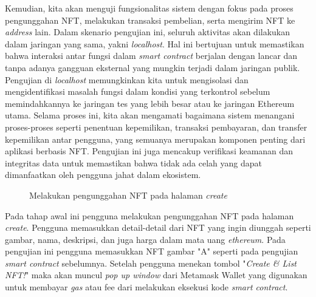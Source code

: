     Kemudian, kita akan menguji fungsionalitas sistem dengan fokus pada proses pengunggahan NFT, melakukan transaksi pembelian, serta mengirim NFT ke \emph{address} lain. Dalam skenario pengujian ini, seluruh aktivitas akan dilakukan dalam jaringan yang sama, yakni \emph{localhost}. Hal ini bertujuan untuk memastikan bahwa interaksi antar fungsi dalam \emph{smart contract} berjalan dengan lancar dan tanpa adanya gangguan eksternal yang mungkin terjadi dalam jaringan publik. Pengujian di \emph{localhost} memungkinkan kita untuk mengisolasi dan mengidentifikasi masalah fungsi dalam kondisi yang terkontrol sebelum memindahkannya ke jaringan tes yang lebih besar atau ke jaringan Ethereum utama. Selama proses ini, kita akan mengamati bagaimana sistem menangani proses-proses seperti penentuan kepemilikan, transaksi pembayaran, dan transfer kepemilikan antar pengguna, yang semuanya merupakan komponen penting dari aplikasi berbasis NFT. Pengujian ini juga mencakup verifikasi keamanan dan integritas data untuk memastikan bahwa tidak ada celah yang dapat dimanfaatkan oleh pengguna jahat dalam ekosistem.
  
  \begin{figure} [H] \centering
    \caption{Melakukan pengunggahan NFT pada halaman \emph{create}}
    \label{fig:createnft}
    \end{figure}

  Pada tahap awal ini pengguna melakukan pengunggahan NFT pada halaman \emph{create}. Pengguna memasukkan detail-detail dari NFT yang ingin diunggah seperti gambar, nama, deskripsi, dan juga harga dalam mata uang \emph{ethereum}. Pada pengujian ini pengguna memasukkan NFT gambar "A" seperti pada pengujian \emph{smart contract} sebelumnya. Setelah pengguna menekan tombol "\emph{Create \& List NFT!}" maka akan muncul \emph{pop up window} dari Metamask Wallet yang digunakan untuk membayar \emph{gas} atau fee dari melakukan eksekusi kode \emph{smart contract}. 
  
